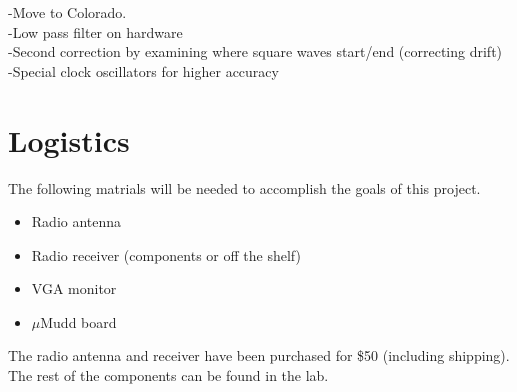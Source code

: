 \documentclass[11pt]{article}
\begin{document}
-Move to Colorado.\\
-Low pass filter on hardware\\
-Second correction by examining where square waves start/end (correcting drift)\\
-Special clock oscillators for higher accuracy\\


\section{Logistics}
The following matrials will be needed to accomplish the goals of this project.
\begin{itemize}
  \item Radio antenna
  \item Radio receiver (components or off the shelf)
  \item VGA monitor
  \item $\mu$Mudd board
\end{itemize}
The radio antenna and receiver have been purchased for \$50 (including shipping). The rest
of the components can be found in the lab.


\nocite{*}
%
%
\end{document}
